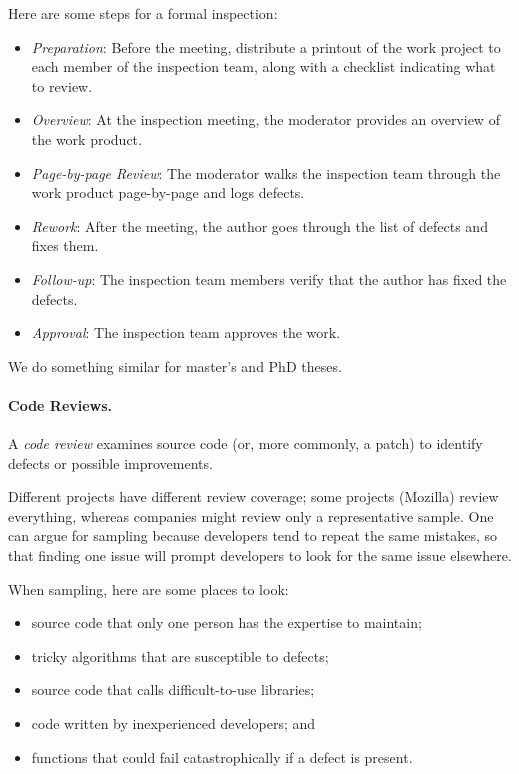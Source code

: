 Here are some steps for a formal inspection:
\begin{itemize}
\item \emph{Preparation}: Before the meeting, distribute a printout of the work project to each member of the inspection team, along with a checklist indicating what to review.
\item \emph{Overview}: At the inspection meeting, the moderator
provides an overview of the work product.
\item \emph{Page-by-page Review}: The moderator walks the inspection team
through the work product page-by-page and logs defects.
\item \emph{Rework}: After the meeting, the author
goes through the list of defects and fixes them.
\item \emph{Follow-up}: The inspection team members verify that
the author has fixed the defects.
\item \emph{Approval}: The inspection team approves the work.
\end{itemize}
We do something similar for master's and PhD theses.

\paragraph{Code Reviews.}

A \emph{code review} examines source code (or, more commonly, a patch)
to identify defects or possible improvements.

Different projects have different review coverage; some projects
(Mozilla) review everything, whereas companies might review only 
a representative sample. One can argue for sampling because developers
tend to repeat the same mistakes, so that finding one issue will prompt
developers to look for the same issue elsewhere. 

When sampling, here are some places to look:
\begin{itemize}
\item source code that only one person has the expertise to maintain;
\item tricky algorithms that are susceptible to defects;
\item source code that calls difficult-to-use libraries;
\item code written by inexperienced developers; and
\item functions that could fail catastrophically if a defect is present.
\end{itemize}

